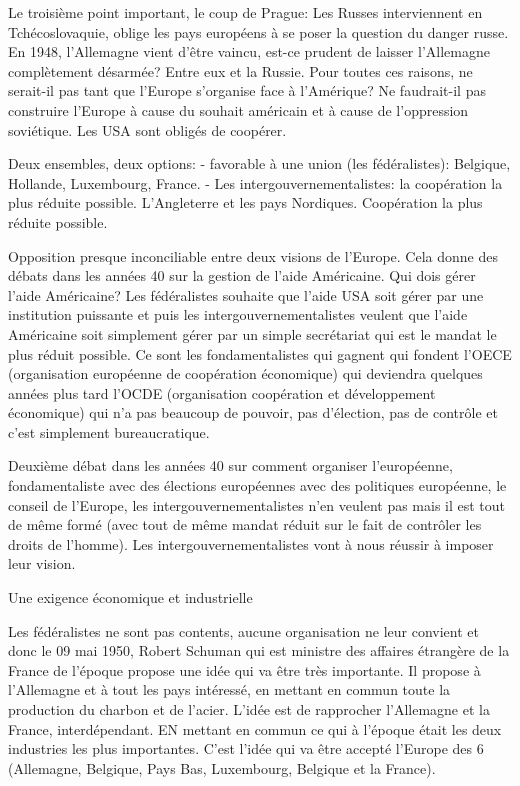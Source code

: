 Le troisième point important, le coup de Prague:
Les Russes interviennent en Tchécoslovaquie, oblige les pays européens à se poser la question du danger russe. En 1948, l'Allemagne vient d'être vaincu, est-ce prudent de laisser l'Allemagne complètement désarmée? Entre eux et la Russie.
Pour toutes ces raisons, ne serait-il pas tant que l'Europe s'organise face à l'Amérique? Ne faudrait-il pas construire l'Europe à cause du souhait américain et à cause de l'oppression soviétique. Les USA sont obligés de coopérer.

Deux ensembles, deux options: 
-	favorable à une union (les fédéralistes): Belgique, Hollande, Luxembourg, France.
- 	Les intergouvernementalistes: la coopération la plus réduite possible. L'Angleterre et les pays Nordiques. Coopération la plus réduite possible.

Opposition presque inconciliable entre deux visions de l'Europe. Cela donne des débats dans les années 40 sur la gestion de l'aide Américaine. Qui dois gérer l'aide Américaine? Les fédéralistes souhaite que l'aide USA soit gérer par une institution puissante et puis les intergouvernementalistes veulent que l'aide Américaine soit simplement gérer par un simple secrétariat qui est le mandat le plus réduit possible. Ce sont les fondamentalistes qui gagnent qui fondent l'OECE (organisation européenne de coopération économique) qui deviendra quelques années plus tard l'OCDE (organisation coopération et développement économique) qui n'a pas beaucoup de pouvoir, pas d'élection, pas de contrôle et c'est simplement bureaucratique.

Deuxième débat dans les années 40 sur comment organiser l'européenne, fondamentaliste avec des élections européennes avec des politiques européenne, le conseil de l'Europe, les intergouvernementalistes n'en veulent pas mais il est tout de même formé (avec tout de même mandat réduit sur le fait de contrôler les droits de l'homme). Les intergouvernementalistes vont à nous réussir à imposer leur vision.


Une exigence économique et industrielle


Les fédéralistes ne sont pas contents, aucune organisation ne leur convient et donc le 09 mai 1950, Robert Schuman qui est ministre des affaires étrangère de la France de l'époque propose une idée qui va être très importante. Il propose à l'Allemagne et à tout les pays intéressé, en mettant en commun toute la production du charbon et de l'acier. L'idée est de rapprocher l'Allemagne et la France, interdépendant. EN mettant en commun ce qui à l'époque était les deux industries les plus importantes.
C'est l'idée qui va être accepté l'Europe des 6 (Allemagne, Belgique, Pays Bas, Luxembourg, Belgique et la France).

